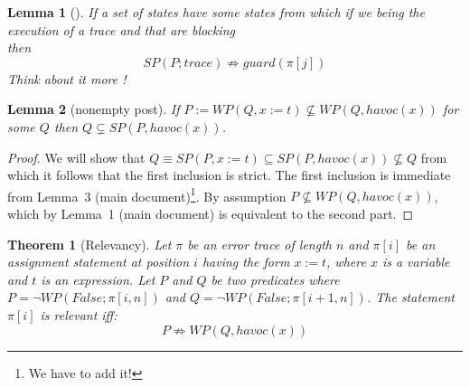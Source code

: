 \documentclass{article}
\newcommand{\limp}{\Rightarrow}
\newcommand{\WP}[2]{\mathit{WP}(#1,#2)}
\newcommand{\SP}[2]{\mathit{SP}(#1,#2)}
\newcommand{\havoc}{\mathit{havoc}}
\newtheorem{theorem}{Theorem}
\newtheorem{lemma}{Lemma}
\begin{document}
\begin{lemma}[]\label{lemma:neg_wp_assignment}
If a set of states have some states from which if we being the execution of a trace and that are blocking\\
then $$SP(P; trace)\not \limp guard(\pi[j])$$ 
Think about it more !
\end{lemma}

\begin{lemma}[nonempty post]\label{lemma:nonempty_post}
If $P := \WP{Q}{x := t} \nsubseteq \WP{Q}{\havoc(x)}$ for some $Q$ then $Q \subsetneq \SP{P}{\havoc(x)}$.
\end{lemma}
\begin{proof}
	We will show that $Q \equiv \SP{P}{x := t} \subseteq \SP{P}{\havoc(x)} \not\subseteq Q$ from which it follows that the first inclusion is strict.
	The first inclusion is immediate from Lemma~3 (main document)\footnote{We have to add it!}.
	By assumption $P \not\subseteq \WP{Q}{\havoc(x)}$, which by Lemma~1 (main document) is equivalent to the second part.
\end{proof}

\newpage
\begin{theorem}[Relevancy]\label{mydef:relevancytheorem}
Let $\pi$ be an error trace of length $n$ and $\pi[i]$ be an assignment statement at position $i$ having the form $x:=t$, where $x$ is a variable and $t$ is an expression. Let $P$ and $Q$ be two predicates where $P = \neg WP(False; \pi[i,n])$ and $Q =  \neg WP(False; \pi[i+1,n])$. The statement $\pi[i]$ is relevant iff:
 $$P \not \limp WP(Q,havoc(x))$$
\end{theorem}
\end{document}
